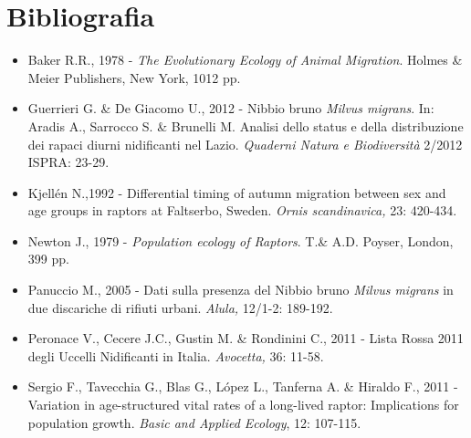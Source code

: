 \section*{Bibliografia}
\begin{itemize}\itemsep0pt
	\item Baker R.R., 1978 - \textit{The Evolutionary Ecology of Animal
Migration}. Holmes \& Meier Publishers, New York, 1012 pp.

	\item Guerrieri G. \& De Giacomo U., 2012 - Nibbio bruno \textit{Milvus
migrans}. In: Aradis A., Sarrocco S. \& Brunelli M. Analisi dello
status e della distribuzione dei rapaci diurni nidificanti nel Lazio.
\textit{Quaderni Natura e Biodiversit\`a} 2/2012 ISPRA: 23-29.

	\item Kjell\'en N.,1992 - Differential timing of autumn migration between sex
and age groups in raptors at Faltserbo, Sweden. \textit{Ornis
scandinavica,} 23: 420-434.

	\item Newton J., 1979 - \textit{Population ecology of Raptors}. T.\& A.D.
Poyser, London, 399 pp.

	\item Panuccio M., 2005 - Dati sulla presenza del Nibbio bruno \textit{Milvus
migrans} in due discariche di rifiuti urbani. \textit{Alula,} 12/1-2:
189-192.

	\item Peronace V., Cecere J.C., Gustin M. \& Rondinini C., 2011 - Lista Rossa
2011 degli Uccelli Nidificanti in Italia. \textit{Avocetta,} 36: 11-58.

	\item Sergio F., Tavecchia G., Blas G., L\'opez L., Tanferna A. \& Hiraldo F.,
2011 - Variation in age-structured vital rates of a long-lived raptor:
Implications for population growth. \textit{Basic and Applied Ecology},
12: 107-115.
\end{itemize}
